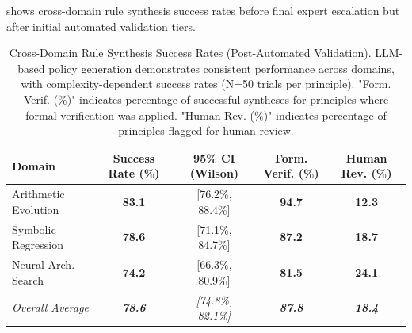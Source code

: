 \documentclass[manuscript,screen,review,anonymous,9pt]{acmart}
\newcommand{\tablesize}{\footnotesize} %
\newcommand{\tablenumfmt}[1]{\textbf{#1}}
\newcommand{\tableheader}[1]{\textbf{#1}}
\begin{document}
 shows cross-domain rule synthesis success rates before final expert escalation but after initial automated validation tiers.
\begin{table}[htbp]
\centering
\caption{Cross-Domain Rule Synthesis Success Rates (Post-Automated Validation). LLM-based policy generation demonstrates consistent performance across domains, with complexity-dependent success rates (N=50 trials per principle). "Form. Verif. (\%)" indicates percentage of successful syntheses for principles where formal verification was applied. "Human Rev. (\%)" indicates percentage of principles flagged for human review.}
\label{tab:synthesis_comprehensive}
\tablesize
\begin{tabular}{@{}lcccc@{}}
\toprule
\tableheader{Domain} & \tableheader{Success Rate (\%)} & \tableheader{95\% CI (Wilson)} & \tableheader{Form. Verif. (\%)} & \tableheader{Human Rev. (\%)} \\
\midrule
Arithmetic Evolution & \tablenumfmt{83.1} & [76.2\%, 88.4\%] & \tablenumfmt{94.7} & \tablenumfmt{12.3} \\
Symbolic Regression  & \tablenumfmt{78.6} & [71.1\%, 84.7\%] & \tablenumfmt{87.2} & \tablenumfmt{18.7} \\
Neural Arch. Search & \tablenumfmt{74.2} & [66.3\%, 80.9\%] & \tablenumfmt{81.5} & \tablenumfmt{24.1} \\
\midrule
\textit{Overall Average} & \textit{\tablenumfmt{78.6}} & \textit{[74.8\%, 82.1\%]} & \textit{\tablenumfmt{87.8}} & \textit{\tablenumfmt{18.4}} \\
\bottomrule
\end{tabular}
\end{table}
\end{document}
